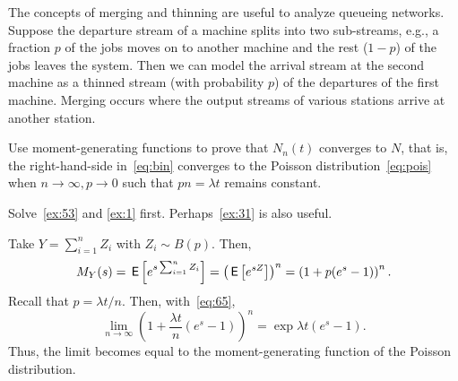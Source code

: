 The concepts of merging and thinning are useful to analyze queueing networks.
Suppose the departure stream of a machine splits into two sub-streams, e.g., a fraction $p$ of the jobs moves on to another machine and the rest ($1-p$) of the jobs leaves the system.
Then we can model the arrival stream at the second machine as a thinned stream (with probability $p$) of the departures of the first machine.
Merging occurs where the output streams of various stations arrive at another station.

\begin{exercise} 
 Use moment-generating functions to prove that $N_n(t)$ converges to $N$, that is, the right-hand-side in~\cref{eq:bin} converges to the Poisson distribution~\cref{eq:pois} when $n\to \infty, p\to 0$ such that $p n=\lambda t$ remains constant.
\begin{hint}
Solve~\cref{ex:53} and \cref{ex:1} first. Perhaps~\cref{ex:31} is also useful.
\end{hint}
\begin{solution}
Take $Y=\sum_{i=1}^n Z_i$ with $Z_i\sim B(p)$. Then, 
\begin{equation*}
M_Y(s) = \,\mathsf{E}\left[e^{s\sum_{i=1}^n Z_i}\right] = \left(\,\mathsf{E}\left[e^{s Z}\right]\right)^n = \left(1 + p (e^s - 1)\right)^n. 
\end{equation*}
Recall that $p= \lambda t/ n$. Then, with~\cref{eq:65},
\begin{equation*}
\lim_{n\to\infty} \left(1 + \frac{\lambda t}{n} (e^s - 1)\right)^n = \exp{\lambda t (e^s-1)}. 
\end{equation*}
Thus, the limit becomes equal to the moment-generating function of the Poisson distribution. 
\end{solution}

\end{exercise}





